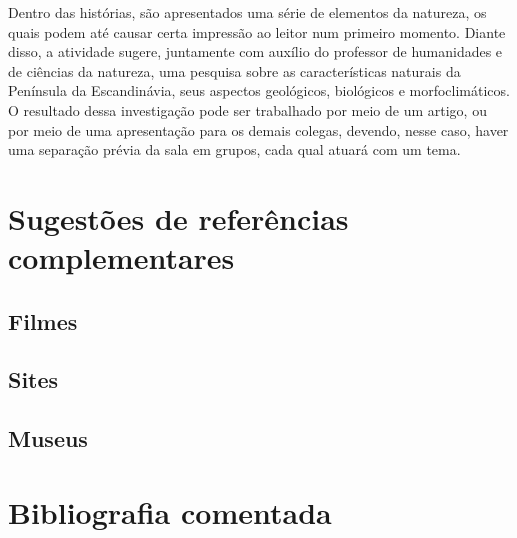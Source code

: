 \documentclass[12pt]{extarticle}
\begin{document}
Dentro das histórias, são apresentados uma série de elementos da
natureza, os quais podem até causar certa impressão ao leitor num
primeiro momento. Diante disso, a atividade sugere, juntamente com
auxílio do professor de humanidades e de ciências da natureza, uma
pesquisa sobre as características naturais da Península da
Escandinávia, seus aspectos geológicos, biológicos e morfoclimáticos.
O resultado dessa investigação pode ser trabalhado por meio de um
artigo, ou por meio de uma apresentação para os demais colegas,
devendo, nesse caso, haver uma separação prévia da sala em grupos,
cada qual atuará com um tema.

\section{Sugestões de referências complementares}\label{sugestoes}

\subsection{Filmes}
\subsection{Sites}
\subsection{Museus}
\section{Bibliografia comentada}
\end{document}
